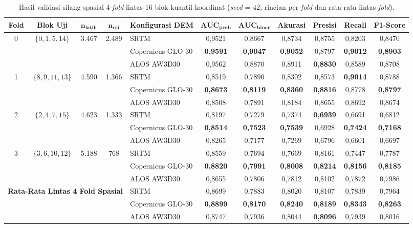 \documentclass[12pt,a4paper]{article}
\newenvironment{adjustbox}[1]{%
  \begin{lrbox}{\adjboxtemp}%
}{%
  \end{lrbox}%
  \ifdim\wd\adjboxtemp>\textwidth
    \resizebox{\textwidth}{!}{\usebox{\adjboxtemp}}%
  \else
    \usebox{\adjboxtemp}%
  \fi
}
\begin{document}
\begin{table}[!htbp]
\small
\centering
\caption[Hasil validasi silang spasial 4-fold lintas 16 blok kuantil]{Hasil validasi silang spasial 4-\textit{fold} lintas 16 blok kuantil koordinat (\textit{seed} = 42; rincian per \textit{fold} dan rata-rata lintas \textit{fold}).}
\label{tab:spatial-cv}
\begin{adjustbox}{max width=\textwidth}
\begin{tabular}{c c c c l cccccc}
\toprule
\textbf{Fold} & \textbf{Blok Uji} & $\boldsymbol{n_{\text{latih}}}$ & $\boldsymbol{n_{\text{uji}}}$ & \textbf{Konfigurasi DEM} & $\textbf{AUC}_{\textbf{prob}}$ & $\textbf{AUC}_{\textbf{biner}}$ & \textbf{Akurasi} & \textbf{Presisi} & \textbf{Recall} & \textbf{F1-Score} \\
\midrule
0 & $\{0, 1, 5, 14\}$ & 3.467 & 2.489 & SRTM & 0,9521 & 0,8667 & 0,8734 & 0,8755 & 0,8203 & 0,8470 \\
  & & & & Copernicus GLO-30 & \textbf{0,9591} & \textbf{0,9047} & \textbf{0,9052} & 0,8797 & \textbf{0,9012} & \textbf{0,8903} \\
  & & & & ALOS AW3D30 & 0,9562 & 0,8870 & 0,8911 & \textbf{0,8830} & 0,8589 & 0,8708 \\
\midrule
1 & $\{8, 9, 11, 13\}$ & 4.590 & 1.366 & SRTM & 0,8519 & 0,7890 & 0,8302 & 0,8573 & \textbf{0,9014} & 0,8788 \\
  & & & & Copernicus GLO-30 & \textbf{0,8673} & \textbf{0,8119} & \textbf{0,8360} & \textbf{0,8816} & 0,8778 & \textbf{0,8797} \\
  & & & & ALOS AW3D30 & 0,8508 & 0,7891 & 0,8184 & 0,8655 & 0,8692 & 0,8674 \\
\midrule
2 & $\{2, 4, 7, 15\}$ & 4.623 & 1.333 & SRTM & 0,8197 & 0,7279 & 0,7374 & \textbf{0,6939} & 0,6691 & 0,6812 \\
  & & & & Copernicus GLO-30 & \textbf{0,8514} & \textbf{0,7523} & \textbf{0,7539} & 0,6928 & \textbf{0,7424} & \textbf{0,7168} \\
  & & & & ALOS AW3D30 & 0,8265 & 0,7177 & 0,7269 & 0,6796 & 0,6601 & 0,6697 \\
\midrule
3 & $\{3, 6, 10, 12\}$ & 5.188 & 768 & SRTM & 0,8559 & 0,7694 & 0,7669 & 0,8161 & 0,7447 & 0,7787 \\
  & & & & Copernicus GLO-30 & \textbf{0,8820} & \textbf{0,7991} & \textbf{0,8008} & \textbf{0,8214} & \textbf{0,8156} & \textbf{0,8185} \\
  & & & & ALOS AW3D30 & 0,8655 & 0,7806 & 0,7812 & 0,8102 & 0,7872 & 0,7986 \\
\midrule
\multicolumn{4}{l}{\textbf{Rata-Rata Lintas 4 Fold Spasial}} & SRTM & 0,8699 & 0,7883 & 0,8020 & 0,8107 & 0,7839 & 0,7964 \\
\multicolumn{4}{l}{} & Copernicus GLO-30 & \textbf{0,8899} & \textbf{0,8170} & \textbf{0,8240} & \textbf{0,8189} & \textbf{0,8343} & \textbf{0,8263} \\
\multicolumn{4}{l}{} & ALOS AW3D30 & 0,8747 & 0,7936 & 0,8044 & \textbf{0,8096} & 0,7939 & 0,8016 \\
\bottomrule
\end{tabular}
\end{adjustbox}
\end{table}
\end{document}
